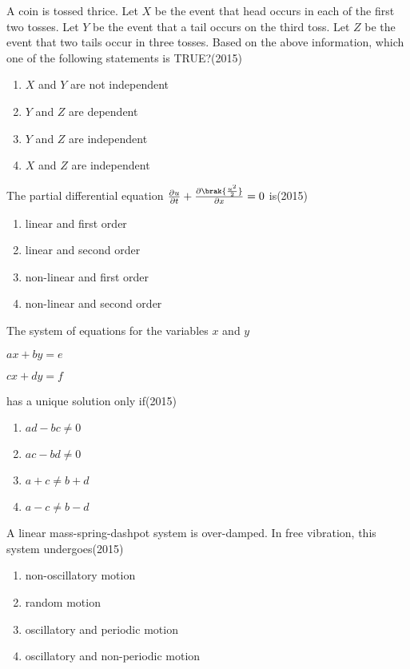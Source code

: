 \item A coin is tossed thrice. Let $X$ be the event that head occurs in each of the first two tosses. Let $Y$ be the event that a tail occurs on the third toss. Let $Z$ be the event that two tails occur in three tosses. Based on the above information, which one of the following statements is TRUE?\hfill(2015)
\begin{multicols}{2}
\begin{enumerate}
\item $X$ and $Y$ are not independent
\item $Y$ and $Z$ are dependent
\item $Y$ and $Z$ are independent
\item $X$ and $Z$ are independent
\end{enumerate}
\end{multicols}


\item The partial differential equation $\frac{\partial u}{\partial t}+\frac{\partial\brak{\frac{u^{2}}{2}}}{\partial x}=0$ is\hfill(2015)
\begin{multicols}{2}
\begin{enumerate}
\item linear and first order
\item linear and second order
\item non-linear and first order
\item non-linear and second order
\end{enumerate}
\end{multicols}


\item The system of equations for the variables $x$ and $y$

$ax+by=e$

$cx+dy=f$

has a unique solution only if\hfill(2015)
\begin{multicols}{2}
\begin{enumerate}
\item $ad-bc\neq 0$
\item $ac-bd\neq 0$
\item $a+c\neq b+d$
\item $a-c\neq b-d$
\end{enumerate}
\end{multicols}


\item A linear mass-spring-dashpot system is over-damped. In free vibration, this system undergoes\hfill(2015)
\begin{multicols}{2}
\begin{enumerate}
\item non-oscillatory motion
\item random motion
\item oscillatory and periodic motion
\item oscillatory and non-periodic motion
\end{enumerate}
\end{multicols}